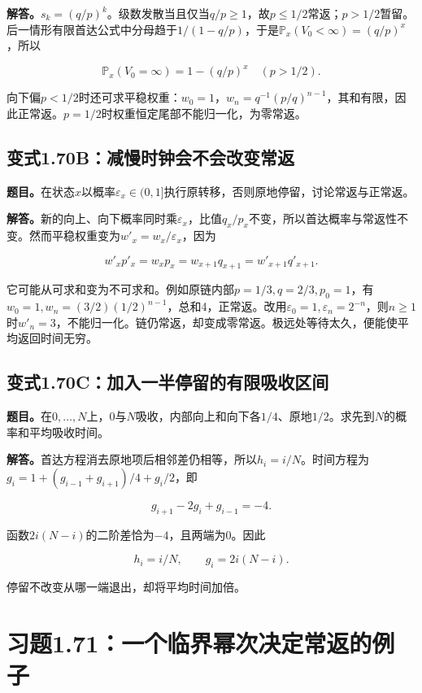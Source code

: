 \documentclass[
  11pt,a4paper,UTF8,fontset=fandol]{ctexart}
\begin{document}
\textbf{解答。}\(s_k=(q/p)^k\)。级数发散当且仅当\(q/p\ge1\)，故\(p\le1/2\)常返；\(p>1/2\)暂留。后一情形有限首达公式中分母趋于\(1/(1-q/p)\)，于是\(\mathbb P_x(V_0<\infty)=(q/p)^x\)，所以

\[\boxed{\mathbb P_x(V_0=\infty)=1-(q/p)^x\quad(p>1/2).}\]

向下偏\(p<1/2\)时还可求平稳权重：\(w_0=1\)，\(w_n=q^{-1}(p/q)^{n-1}\)，其和有限，因此正常返。\(p=1/2\)时权重恒定尾部不能归一化，为零常返。

\subsection{变式1.70B：减慢时钟会不会改变常返}\label{ux53d8ux5f0f1.70bux51cfux6162ux65f6ux949fux4f1aux4e0dux4f1aux6539ux53d8ux5e38ux8fd4}

\textbf{题目。}在状态\(x\)以概率\(\varepsilon_x\in(0,1]\)执行原转移，否则原地停留，讨论常返与正常返。

\textbf{解答。}新的向上、向下概率同时乘\(\varepsilon_x\)，比值\(q_x/p_x\)不变，所以首达概率与常返性不变。然而平稳权重变为\(w'_x=w_x/\varepsilon_x\)，因为

\[w'_xp'_x=w_xp_x=w_{x+1}q_{x+1}=w'_{x+1}q'_{x+1}.\]

它可能从可求和变为不可求和。例如原链内部\(p=1/3,q=2/3,p_0=1\)，有\(w_0=1,w_n=(3/2)(1/2)^{n-1}\)，总和4，正常返。改用\(\varepsilon_0=1,\varepsilon_n=2^{-n}\)，则\(n\ge1\)时\(w'_n=3\)，不能归一化。链仍常返，却变成零常返。极远处等待太久，便能使平均返回时间无穷。

\subsection{变式1.70C：加入一半停留的有限吸收区间}\label{ux53d8ux5f0f1.70cux52a0ux5165ux4e00ux534aux505cux7559ux7684ux6709ux9650ux5438ux6536ux533aux95f4}

\textbf{题目。}在\(0,\ldots,N\)上，0与\(N\)吸收，内部向上和向下各\(1/4\)、原地\(1/2\)。求先到\(N\)的概率和平均吸收时间。

\textbf{解答。}首达方程消去原地项后相邻差仍相等，所以\(h_i=i/N\)。时间方程为\(g_i=1+(g_{i-1}+g_{i+1})/4+g_i/2\)，即

\[g_{i+1}-2g_i+g_{i-1}=-4.\]

函数\(2i(N-i)\)的二阶差恰为\(-4\)，且两端为0。因此

\[\boxed{h_i=i/N,\qquad g_i=2i(N-i).}\]

停留不改变从哪一端退出，却将平均时间加倍。

\section{习题1.71：一个临界幂次决定常返的例子}\label{ux4e60ux98981.71ux4e00ux4e2aux4e34ux754cux5e42ux6b21ux51b3ux5b9aux5e38ux8fd4ux7684ux4f8bux5b50}
\end{document}

